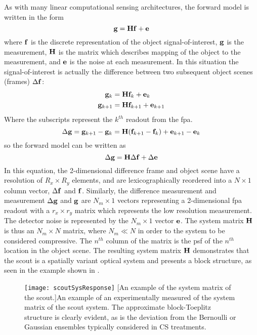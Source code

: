 As with many linear computational sensing architectures, the forward model is written in the form
%
\begin{equation}
	\displaystyle \mathbf{g} = \displaystyle \mathbf{H} \displaystyle \mathbf{f} + \displaystyle \mathbf{e}
\end{equation}
%
where $\displaystyle \mathbf{f}$ is the discrete representation of the object signal-of-interest, $\displaystyle \mathbf{g}$ is the measurement, $\displaystyle \mathbf{H}$ is the matrix which describes mapping of the object to the measurement, and $\displaystyle \mathbf{e}$ is the noise at each measurement. In this situation the signal-of-interest is actually the difference between two subsequent object scenes (frames) $\Delta \displaystyle \mathbf{f}$:
%
%
\begin{equation} 
\begin{split}
	\displaystyle \mathbf{g}_{k} &= \displaystyle \mathbf{H} \displaystyle \mathbf{f}_{k} + \displaystyle \mathbf{e}_{k} \\
	\displaystyle \mathbf{g}_{k+1} &= \displaystyle \mathbf{H} \displaystyle \mathbf{f}_{k+1} + \displaystyle \mathbf{e}_{k+1}
\end{split}
\end{equation}
%
Where the subscripts represent the $k^{th}$ readout from the \gls{fpa}.
%
\begin{equation}
	\Delta \mb{g} = \mb{g}_{k+1} - \mb{g}_{k} = \mb{H} \ap{ \mb{f}_{k+1} - \mb{f}_{k} } + \mb{e}_{k+1} - \mb{e}_{k} 
\end{equation}
%
%
so the forward model can be written as
%
\begin{equation}
	\Delta \displaystyle \mathbf{g} = \displaystyle \mathbf{H} \Delta \displaystyle \mathbf{f}  + \Delta \displaystyle \mathbf{e}
	\label{eq:scoutgHf}
\end{equation}
%
In this equation, the 2-dimensional difference frame and object scene have a resolution of $ R_x \times R_y$ elements, and are lexicographically reordered into a $N \times 1$ column vector, $\Delta \displaystyle \mathbf{f}$ and $\displaystyle \mathbf{f}$. Similarly, the difference measurement and measurement $\Delta \displaystyle \mathbf{g}$ and $\displaystyle \mathbf{g}$ are $N_m \times 1$ vectors representing a 2-dimensional \gls{fpa} readout with a $ r_x \times r_y$ matrix which represents the low resolution measurement. The detector noise is represented by the $ N_m \times 1 $ vector $\displaystyle \mathbf{e}$. The system matrix $\displaystyle \mathbf{H}$ is thus an $N_m \times N $ matrix, where $N_m \ll N$ in order to the system to be considered compressive. The $n^{th}$ column of the matrix is the \gls{psf} of the $n^{th}$ location in the object scene. The resulting system matrix $\displaystyle \mathbf{H}$ demonstrates that the \gls{scout} is a spatially variant optical system and presents a block structure, as seen in the example shown in .

\begin{sidewaysfigure}
	\texttt{[image: scoutSysResponse]}
	[An example of the system matrix of the \gls{scout}.]{An example of an experimentally measured of the system matrix of the \gls{scout} system. The approximate block-Toeplitz structure is clearly evident, as is the deviation from the Bernoulli or Gaussian ensembles typically considered in CS treatments. }
	\label{fig:scoutSysResponse}
\end{sidewaysfigure}


